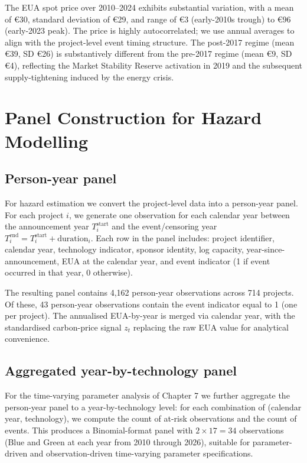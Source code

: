 \documentclass[11pt,a4paper]{article}
\begin{document}
The EUA spot price over 2010--2024 exhibits substantial variation, with a mean of \euro 30, standard deviation of \euro 29, and range of \euro 3 (early-2010s trough) to \euro 96 (early-2023 peak). The price is highly autocorrelated; we use annual averages to align with the project-level event timing structure. The post-2017 regime (mean \euro 39, SD \euro 26) is substantively different from the pre-2017 regime (mean \euro 9, SD \euro 4), reflecting the Market Stability Reserve activation in 2019 and the subsequent supply-tightening induced by the energy crisis.

\section{Panel Construction for Hazard Modelling}
\label{sec:ch4-panel}

\subsection{Person-year panel}

For hazard estimation we convert the project-level data into a person-year panel. For each project $i$, we generate one observation for each calendar year between the announcement year $T^{\mathrm{start}}_i$ and the event/censoring year $T^{\mathrm{end}}_i = T^{\mathrm{start}}_i + \mathrm{duration}_i$. Each row in the panel includes: project identifier, calendar year, technology indicator, sponsor identity, log capacity, year-since-announcement, EUA at the calendar year, and event indicator (1 if event occurred in that year, 0 otherwise).

The resulting panel contains 4,162 person-year observations across 714 projects. Of these, 43 person-year observations contain the event indicator equal to 1 (one per project). The annualised EUA-by-year is merged via calendar year, with the standardised carbon-price signal $z_t$ replacing the raw EUA value for analytical convenience.

\subsection{Aggregated year-by-technology panel}

For the time-varying parameter analysis of Chapter 7 we further aggregate the person-year panel to a year-by-technology level: for each combination of (calendar year, technology), we compute the count of at-risk observations and the count of events. This produces a Binomial-format panel with $2 \times 17 = 34$ observations (Blue and Green at each year from 2010 through 2026), suitable for parameter-driven and observation-driven time-varying parameter specifications.
\end{document}
